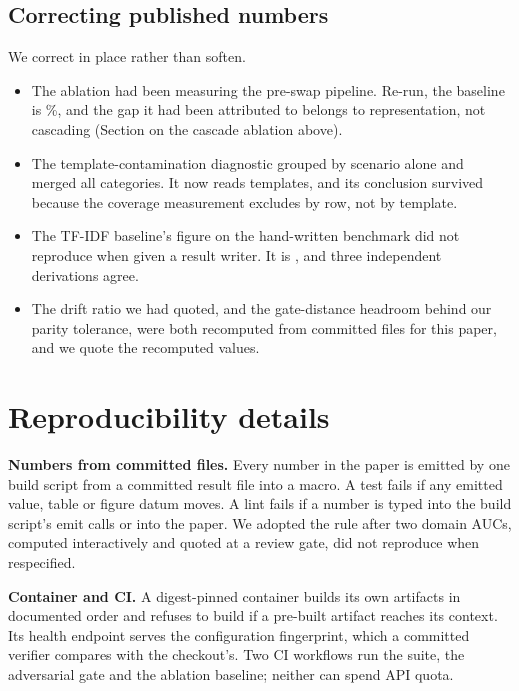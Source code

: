 \documentclass[conference,onecolumn,a4paper]{IEEEtran}
\begin{document}
\subsection{Correcting published numbers}
We correct in place rather than soften.
\begin{itemize}
\item The ablation had been measuring the pre-swap pipeline. Re-run, the baseline is \%, and the gap it had been attributed to belongs to representation, not cascading (Section on the cascade ablation above).
\item The template-contamination diagnostic grouped by scenario alone and merged all categories. It now reads  templates, and its conclusion survived because the coverage measurement excludes by row, not by template.
\item The TF-IDF baseline's figure on the hand-written benchmark did not reproduce when given a result writer. It is , and three independent derivations agree.
\item The drift ratio we had quoted, and the gate-distance headroom behind our parity tolerance, were both recomputed from committed files for this paper, and we quote the recomputed values.
\end{itemize}

\section{Reproducibility details}
\textbf{Numbers from committed files.} Every number in the paper is emitted by one build script from a committed result file into a macro. A test fails if any emitted value, table or figure datum moves. A lint fails if a number is typed into the build script's emit calls or into the paper. We adopted the rule after two domain AUCs, computed interactively and quoted at a review gate, did not reproduce when respecified.

\textbf{Container and CI.} A digest-pinned container builds its own artifacts in documented order and refuses to build if a pre-built artifact reaches its context. Its health endpoint serves the configuration fingerprint, which a committed verifier compares with the checkout's. Two CI workflows run the suite, the adversarial gate and the ablation baseline; neither can spend API quota.
\end{document}
